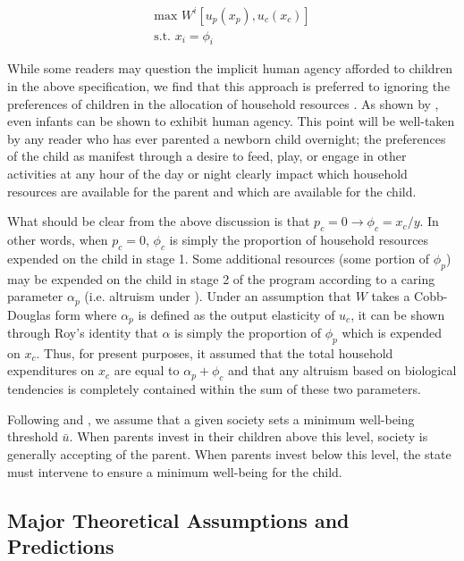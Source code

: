 \begin{eqnarray}
  \text{max } W^i[u_p(x_p), u_c(x_c)] \\
  \nonumber
  \text{s.t. } x_i = \phi_i
\end{eqnarray}

While some readers may question the implicit human agency afforded to children in the above specification, we find that this approach is preferred to ignoring the preferences of children in the allocation of household resources \citep[as in, e.g.][]{Blundell2007}. As shown by \citet{Sodian2004}, even infants can be shown to exhibit human agency. This point will be well-taken by any reader who has ever parented a newborn child overnight; the preferences of the child as manifest through a desire to feed, play, or engage in other activities at any hour of the day or night clearly impact which household resources are available for the parent and which are available for the child. 

What should be clear from the above discussion is that $p_c=0 \rightarrow \phi_c=x_c/y$. In other words, when $p_c=0$, $\phi_c$ is simply the proportion of household resources expended on the child in stage 1. Some additional resources (some portion of $\phi_p$) may be expended on the child in stage 2 of the program according to a caring parameter $\alpha_p$ (i.e. altruism under \citet{Becker1981}). Under an assumption that $W$ takes a Cobb-Douglas form where $\alpha_p$ is defined as the output elasticity of $u_c$, it can be shown through Roy's identity \citep{Roy1947} that $\alpha$ is simply the proportion of $\phi_p$ which is expended on $x_c$. Thus, for present purposes, it assumed that the total household expenditures on $x_c$ are equal to $\alpha_p + \phi_c$ and that any altruism based on biological tendencies is completely contained within the sum of these two parameters. 

Following \citet{Brandon2001} and \citet{Brandon1999}, we assume that a given society sets a minimum well-being threshold $\bar{u}$. When parents invest in their children above this level, society is generally accepting of the parent. When parents invest below this level, the state must intervene to ensure a minimum well-being for the child.

\subsection{Major Theoretical Assumptions and Predictions}

